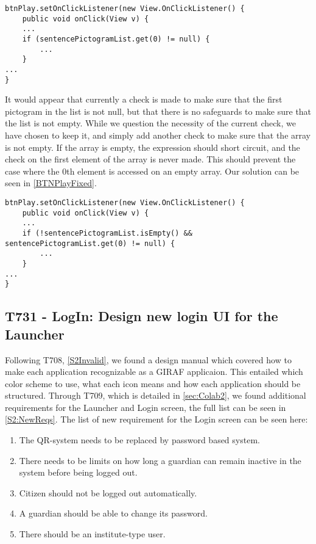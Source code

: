 \begin{minipage}[H]{\linewidth}
\begin{lstlisting}[caption = Accessing the 0th element of a null array., label = BTNPlay] 
btnPlay.setOnClickListener(new View.OnClickListener() {
	public void onClick(View v) {
	...
	if (sentencePictogramList.get(0) != null) {
		...
	}
...
}
\end{lstlisting}
\end{minipage}

It would appear that currently a check is made to make sure that the first
pictogram in the list is not null, but that there is no safeguards to make sure
that the list is not empty. While we question the necessity of the current
check, we have chosen to keep it, and simply add another check to make sure that
the array is not empty. If the array is empty, the expression should short
circuit, and the check on the first element of the array is never made. This
should prevent the case where the 0th element is accessed on an empty array. Our
solution can be seen in \autoref{BTNPlayFixed}.\nl

\begin{minipage}[H]{\linewidth}
\begin{lstlisting}[caption = Our solution to the presented problem., label = BTNPlayFixed] 
btnPlay.setOnClickListener(new View.OnClickListener() {
	public void onClick(View v) {
	...
	if (!sentencePictogramList.isEmpty() && sentencePictogramList.get(0) != null) {
		...
	}
...
}
\end{lstlisting}
\end{minipage}

\subsection{T731 - LogIn: Design new login UI for the
Launcher}\label{DesignLogin}
Following T708, \autoref{S2Invalid}, we found a
design manual which covered how to make each application recognizable as a GIRAF
applicaion. This entailed which color scheme to use, what each icon means and
how each application should be structured. Through T709,
which is detailed in \autoref{sec:Colab2}, we found additional requirements for
the Launcher and Login screen, the full list can be seen in
\autoref{S2:NewReqs}. The list of new requirement for the Login screen can be seen
here:

 \begin{enumerate}
   \item The QR-system needs to be replaced by password based system.
   \item There needs to be limits on how long a guardian can remain inactive in
   the system before being logged out. 
   \item Citizen should not be logged out automatically. 
   \item A guardian should be able to change its password.
   \item There should be an institute-type user.
 \end{enumerate}

